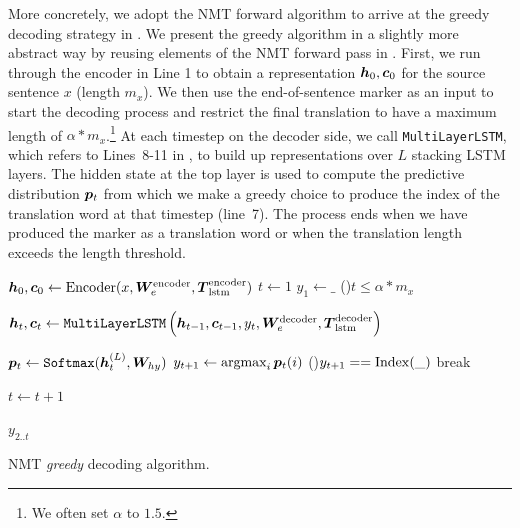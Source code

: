 More concretely, we adopt the NMT forward algorithm to arrive at the greedy
decoding strategy in . We present the greedy
algorithm in a slightly more abstract way by reusing elements of the NMT forward
pass in . First, we run through the encoder in Line 1 to obtain a
representation $\bm{h}_{0}, \bm{c}_{0}$ for the source sentence $x$ (length $m_x$). We
then use the end-of-sentence marker \word{\_} as an input to start the decoding
process and restrict the final translation to have a maximum length of
$\alpha*m_x$.\footnote{We often set $\alpha$ to $1.5$. } At each timestep on the
decoder side, we call \texttt{MultiLayerLSTM}, which refers to Lines~8-11 in
, to build up representations over $L$ stacking LSTM layers. The hidden
state at the top layer is used to compute the predictive distribution $\bm{p}_{t}$
from which we make a greedy choice to produce the index of the translation word
at that timestep (line~7). The process ends when we have produced the marker
\word{\_} as a translation word or when the translation length exceeds the
length threshold.

\begin{algorithm}
$\bm{h}_{0}, \bm{c}_{0} \leftarrow \text{Encoder}(x, \bm{W}_{e}^{\text{encoder}}, \mbox{\boldmath{$T$}}_{\text{lstm}}^{\text{encoder}})$ \;
$t \leftarrow 1$ \;
$y_1 \leftarrow \_$ \;
\While(){$t \leq \alpha * m_x$} {
  $\bm{h}_{t}, \bm{c}_{t} \leftarrow \text{\texttt{MultiLayerLSTM}}\left(\bm{h}_{t-1},
  \bm{c}_{t-1}, y_t, \bm{W}_{e}^{\text{decoder}}, \mbox{\boldmath{$T$}}_{\text{lstm}}^{\text{decoder}}\right)$ \;

  $\bm{p}_{t} \leftarrow \text{\texttt{Softmax}}(\bm{h}_{t}^{(L)},\bm{W}_{hy})$ \;
  $y_{t+1} \leftarrow \mathop{\text{argmax}}_i \bm{p}_{t}(i)$ 
  \If(){$y_{t+1} == \operatorname{Index}(\_)$} {
    break\;
  }

  $t \leftarrow t+1$
}
\Return $y_{2..t}$

\caption{NMT {\it greedy} decoding algorithm.}
\label{a:nmt_greedy}
\end{algorithm}


